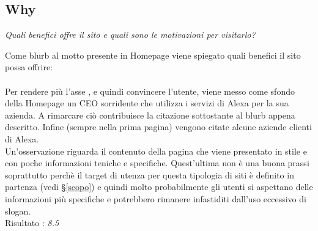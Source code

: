 \subsection{Why}\label{why}
\begin{center}

\textit{Quali benefici offre il sito e quali sono le motivazioni per visitarlo?}

\end{center}
\begin{flushleft}
Come blurb al motto presente in Homepage viene spiegato quali benefici il sito 
possa offrire: \\
\\
Per rendere più  l'asse , e quindi convincere l'utente,
viene messo come sfondo della Homepage un CEO sorridente che utilizza i servizi di Alexa
per la sua azienda. A rimarcare ciò contribuisce la citazione sottostante al 
blurb appena descritto. Infine (sempre nella prima pagina)
vengono citate alcune aziende clienti di Alexa. \\
Un'osservazione riguarda il contenuto della pagina
che viene presentato in stile  e con poche informazioni
teniche e specifiche. Quest'ultima non è una buona prassi soprattutto perchè il target di utenza
per questa tipologia di siti è definito in partenza (vedi §\ref{scopo}) e quindi
molto probabilmente gli utenti si aspettano delle informazioni più specifiche 
e potrebbero rimanere infastiditi dall'uso eccessivo di slogan. \\
Risultato : \textit{8.5}

\end{flushleft}